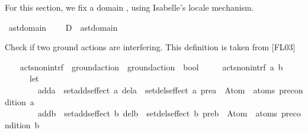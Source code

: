 \begin{isabellebody}
{\isafolddocument}%
%
\isadelimdocument
%
\endisadelimdocument
%
\begin{isamarkuptext}%
For this section, we fix a domain , using Isabelle's
  locale mechanism.%
\end{isamarkuptext}\isamarkuptrue%
\isamarkupfalse%
\ ast{\isacharunderscore}{\kern0pt}domain\ {\isacharequal}{\kern0pt}\isanewline
\ \ \ D\ {\isacharcolon}{\kern0pt}{\isacharcolon}{\kern0pt}\ ast{\isacharunderscore}{\kern0pt}domain\isanewline
{}%
\begin{isamarkuptext}%
Check if two ground actions are interfering. This definition is taken from [FL03]%
\end{isamarkuptext}\isamarkuptrue%
\ \ \isamarkupfalse%
\ acts{\isacharunderscore}{\kern0pt}non{\isacharunderscore}{\kern0pt}intrf\ {\isacharcolon}{\kern0pt}{\isacharcolon}{\kern0pt}\ {\isachardoublequoteopen}ground{\isacharunderscore}{\kern0pt}action\ {\isasymRightarrow}\ ground{\isacharunderscore}{\kern0pt}action\ {\isasymRightarrow}\ bool{\isachardoublequoteclose}\ \isanewline
\ \ \ \ {\isachardoublequoteopen}acts{\isacharunderscore}{\kern0pt}non{\isacharunderscore}{\kern0pt}intrf\ a\ b\ {\isasymlongleftrightarrow}\ {\isacharparenleft}{\kern0pt}\isanewline
\ \ \ \ \ \ let\ \isanewline
\ \ \ \ \ \ \ \ add\isactrlsub a\ {\isacharequal}{\kern0pt}\ set{\isacharparenleft}{\kern0pt}adds{\isacharparenleft}{\kern0pt}effect\ a{\isacharparenright}{\kern0pt}{\isacharparenright}{\kern0pt}{\isacharsemicolon}{\kern0pt}\ del\isactrlsub a\ {\isacharequal}{\kern0pt}\ set{\isacharparenleft}{\kern0pt}dels{\isacharparenleft}{\kern0pt}effect\ a{\isacharparenright}{\kern0pt}{\isacharparenright}{\kern0pt}{\isacharsemicolon}{\kern0pt}\ pre\isactrlsub a\ {\isacharequal}{\kern0pt}\ Atom\ {\isacharbackquote}{\kern0pt}\ atoms\ {\isacharparenleft}{\kern0pt}precondition\ a{\isacharparenright}{\kern0pt}{\isacharsemicolon}{\kern0pt}\isanewline
\ \ \ \ \ \ \ \ add\isactrlsub b\ {\isacharequal}{\kern0pt}\ set{\isacharparenleft}{\kern0pt}adds{\isacharparenleft}{\kern0pt}effect\ b{\isacharparenright}{\kern0pt}{\isacharparenright}{\kern0pt}{\isacharsemicolon}{\kern0pt}\ del\isactrlsub b\ {\isacharequal}{\kern0pt}\ set{\isacharparenleft}{\kern0pt}dels{\isacharparenleft}{\kern0pt}effect\ b{\isacharparenright}{\kern0pt}{\isacharparenright}{\kern0pt}{\isacharsemicolon}{\kern0pt}\ pre\isactrlsub b\ {\isacharequal}{\kern0pt}\ Atom\ {\isacharbackquote}{\kern0pt}\ atoms\ {\isacharparenleft}{\kern0pt}precondition\ b{\isacharparenright}{\kern0pt}\ \isanewline

\end{isabellebody}
